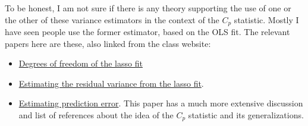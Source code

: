 \documentclass{article}
\begin{document}
\begin{enumerate}[label=(\Alph*)]
To be honest, I am not sure if there is any theory supporting the use of one or the other of these variance estimators in the context of the $C_p$ statistic.  Mostly I have seen people use the former estimator, based on the OLS fit.  The relevant papers here are these, also linked from the class website:
\begin{itemize}
\item \href{https://projecteuclid.org/euclid.aos/1194461726)}{Degrees of freedom of the lasso fit}
\item \href{https://arxiv.org/abs/1311.5274}{Estimating the residual variance from the lasso fit}.
\item \href{https://people.eecs.berkeley.edu/~jordan/sail/readings/archive/efron_Cp.pdf}{Estimating prediction error}.  This paper has a much more extensive discussion and list of references about the idea of the $C_p$ statistic and its generalizations.
\end{itemize}


\end{enumerate}
\end{document}
